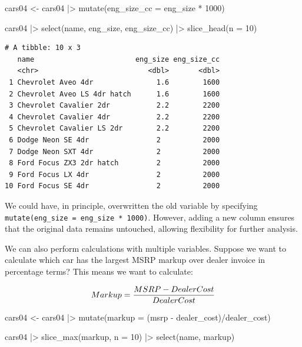 \documentclass[
  letterpaper,
]{book}
\newenvironment{Shaded}{\begin{snugshade}}{\end{snugshade}}
\newcommand{\AttributeTok}[1]{\textcolor[rgb]{0.40,0.45,0.13}{#1}}
\newcommand{\DecValTok}[1]{\textcolor[rgb]{0.68,0.00,0.00}{#1}}
\newcommand{\FunctionTok}[1]{\textcolor[rgb]{0.28,0.35,0.67}{#1}}
\newcommand{\NormalTok}[1]{\textcolor[rgb]{0.00,0.23,0.31}{#1}}
\newcommand{\OtherTok}[1]{\textcolor[rgb]{0.00,0.23,0.31}{#1}}
\newcommand{\SpecialCharTok}[1]{\textcolor[rgb]{0.37,0.37,0.37}{#1}}
\begin{document}
\begin{Shaded}
\begin{Highlighting}[]
\NormalTok{cars04 }\OtherTok{\textless{}{-}}\NormalTok{ cars04 }\SpecialCharTok{|\textgreater{}} 
  \FunctionTok{mutate}\NormalTok{(}\AttributeTok{eng\_size\_cc =}\NormalTok{ eng\_size }\SpecialCharTok{*} \DecValTok{1000}\NormalTok{)}

\NormalTok{cars04 }\SpecialCharTok{|\textgreater{}} 
  \FunctionTok{select}\NormalTok{(name, eng\_size, eng\_size\_cc) }\SpecialCharTok{|\textgreater{}} 
  \FunctionTok{slice\_head}\NormalTok{(}\AttributeTok{n =} \DecValTok{10}\NormalTok{)}
\end{Highlighting}
\end{Shaded}

\begin{verbatim}
# A tibble: 10 x 3
   name                        eng_size eng_size_cc
   <chr>                          <dbl>       <dbl>
 1 Chevrolet Aveo 4dr               1.6        1600
 2 Chevrolet Aveo LS 4dr hatch      1.6        1600
 3 Chevrolet Cavalier 2dr           2.2        2200
 4 Chevrolet Cavalier 4dr           2.2        2200
 5 Chevrolet Cavalier LS 2dr        2.2        2200
 6 Dodge Neon SE 4dr                2          2000
 7 Dodge Neon SXT 4dr               2          2000
 8 Ford Focus ZX3 2dr hatch         2          2000
 9 Ford Focus LX 4dr                2          2000
10 Ford Focus SE 4dr                2          2000
\end{verbatim}

We could have, in principle, overwritten the old variable by specifying
\texttt{mutate(eng\_size\ =\ eng\_size\ *\ 1000)}. However, adding a new
column ensures that the original data remains untouched, allowing
flexibility for further analysis.

We can also perform calculations with multiple variables. Suppose we
want to calculate which car has the largest MSRP markup over dealer
invoice in percentage terms? This means we want to calculate:

\[Markup = \frac{MSRP - Dealer \space Cost}{Dealer \space Cost}\]

\begin{Shaded}
\begin{Highlighting}[]
\NormalTok{cars04 }\OtherTok{\textless{}{-}}\NormalTok{ cars04 }\SpecialCharTok{|\textgreater{}} 
  \FunctionTok{mutate}\NormalTok{(}\AttributeTok{markup =}\NormalTok{ (msrp }\SpecialCharTok{{-}}\NormalTok{ dealer\_cost)}\SpecialCharTok{/}\NormalTok{dealer\_cost)}

\NormalTok{cars04 }\SpecialCharTok{|\textgreater{}} 
  \FunctionTok{slice\_max}\NormalTok{(markup, }\AttributeTok{n =} \DecValTok{10}\NormalTok{) }\SpecialCharTok{|\textgreater{}} 
  \FunctionTok{select}\NormalTok{(name, markup) }
\end{Highlighting}
\end{Shaded}
\end{document}

